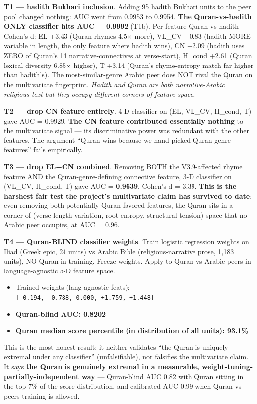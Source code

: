 \documentclass[
]{article}
\providecommand{\tightlist}{%
  \setlength{\itemsep}{0pt}\setlength{\parskip}{0pt}}
\begin{document}
\textbf{T1 --- hadith Bukhari inclusion}. Adding 95 hadith Bukhari units
to the peer pool changed nothing: AUC went from 0.9953 to 0.9954.
\textbf{The Quran-vs-hadith ONLY classifier hits AUC = 0.9992} (T1b).
Per-feature Quran-vs-hadith Cohen's d: EL +3.43 (Quran rhymes 4.5×
more), VL\_CV −0.83 (hadith MORE variable in length, the only feature
where hadith wins), CN +2.09 (hadith uses ZERO of Quran's 14
narrative-connectives at verse-start), H\_cond +2.61 (Quran lexical
diversity 6.85× higher), T +3.14 (Quran's rhyme-entropy match far higher
than hadith's). The most-similar-genre Arabic peer does NOT rival the
Quran on the multivariate fingerprint. \emph{Hadith and Quran are both
narrative-Arabic religious-text but they occupy different corners of
feature space.}

\textbf{T2 --- drop CN feature entirely}. 4-D classifier on (EL, VL\_CV,
H\_cond, T) gave AUC = 0.9929. \textbf{The CN feature contributed
essentially nothing} to the multivariate signal --- its discriminative
power was redundant with the other features. The argument ``Quran wins
because we hand-picked Quran-genre features'' fails empirically.

\textbf{T3 --- drop EL+CN combined}. Removing BOTH the V3.9-affected
rhyme feature AND the Quran-genre-defining connective feature, 3-D
classifier on (VL\_CV, H\_cond, T) gave AUC = \textbf{0.9639}, Cohen's d
= 3.39. \textbf{This is the harshest fair test the project's
multivariate claim has survived to date}: even removing both potentially
Quran-favored features, the Quran sits in a corner of
(verse-length-variation, root-entropy, structural-tension) space that no
Arabic peer occupies, at AUC = 0.96.

\textbf{T4 --- Quran-BLIND classifier weights}. Train logistic
regression weights on Iliad (Greek epic, 24 units) vs Arabic Bible
(religious-narrative prose, 1,183 units), NO Quran in training. Freeze
weights. Apply to Quran-vs-Arabic-peers in language-agnostic 5-D feature
space.

\begin{itemize}
\tightlist
\item
  Trained weights (lang-agnostic feats):
  \texttt{{[}-0.194,\ -0.788,\ 0.000,\ +1.759,\ +1.448{]}}
\item
  \textbf{Quran-blind AUC: 0.8202}
\item
  \textbf{Quran median score percentile (in distribution of all units):
  93.1\%}
\end{itemize}

This is the most honest result: it neither validates ``the Quran is
uniquely extremal under any classifier'' (unfalsifiable), nor falsifies
the multivariate claim. It says \textbf{the Quran is genuinely extremal
in a measurable, weight-tuning-partially-independent way} ---
Quran-blind AUC 0.82 with Quran sitting in the top 7\% of the score
distribution, and calibrated AUC 0.99 when Quran-vs-peers training is
allowed.
\end{document}
